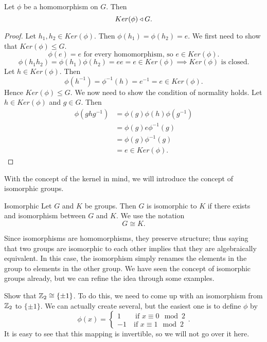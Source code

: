\begin{theorem}{}
    Let $\phi$ be a homomorphism on $G$. Then
    \[
        Ker(\phi)\triangleleft G.
    \]
\end{theorem}
\begin{proof}
    Let $h_{1},h_{2}\in Ker(\phi)$. Then $\phi(h_{1})=\phi(h_{2})=e$. We first need to show that $Ker(\phi)\leq G$.
    \[
        \phi(e)=e\text{ for every homomorphism, so } e\in Ker(\phi).
    \]
    \[
        \phi(h_{1}h_{2})=\phi(h_{1})\phi(h_{2})=ee=e\in Ker(\phi)\implies Ker(\phi)\text{ is closed.}
    \]
    Let $h\in Ker(\phi)$. Then
    \[
        \phi(h^{-1})=\phi^{-1}(h)=e^{-1}=e\in Ker(\phi).
    \]
    Hence $Ker(\phi)\leq G$. We now need to show the condition of normality holds.
    Let $h\in Ker(\phi)$ and $g\in G$. Then
    \begin{align*}
        \phi(ghg^{-1}) &= \phi(g)\phi(h)\phi(g^{-1})\\
        &= \phi(g)e\phi^{-1}(g)\\
        &= \phi(g)\phi^{-1}(g)\\
        &= e\in Ker(\phi).
    \end{align*}
\end{proof}

With the concept of the kernel in mind, we will introduce the concept of isomorphic groups.
\begin{definition}{Isomorphic}
    Let $G$ and $K$ be groups. Then $G$ is isomorphic to $K$ if there exists and isomorphism between $G$ and $K$. We use the notation
    \[
        G\cong K.
    \]
\end{definition}

Since isomorphisms are homomorphisms, they preserve structure; thus saying that two groups are isomorphic to each other implies that they are algebraically equivalent.
In this case, the isomorphism simply renames the elements in the group to elements in the other group.
We have seen the concept of isomorphic groups already, but we can refine the idea through some examples.

\begin{example}{Show that $\mathbb{Z}_{2}\cong \{\pm 1\}$.}
    To do this, we need to come up with an isomorphism from $\mathbb{Z}_{2}$ to $\{\pm 1\}$.
    We can actually create several, but the easiest one is to define $\phi$ by
    \[
        \phi(x) =
        \begin{cases}
            1\qquad\text{if } x\equiv 0\mod 2\\
            -1\quad\text{if } x\equiv 1\mod 2
        \end{cases}.
    \]
    It is easy to see that this mapping is invertible, so we will not go over it here.
\end{example}


